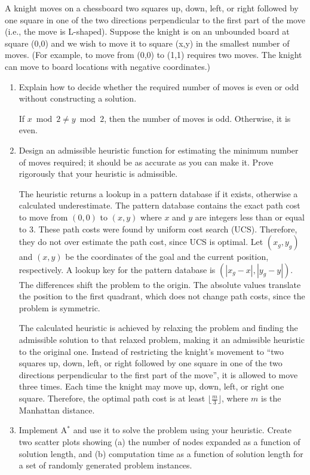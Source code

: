 \documentclass[12pt]{article}
\newenvironment{problem}[2][Problem]{\begin{trivlist}
\item[\hskip \labelsep {\bfseries #1}\hskip \labelsep {\bfseries #2.}]}{\end{trivlist}}
\begin{document}
\begin{problem}{5}
	A knight moves on a chessboard two squares up, down, left, or right followed by one square in one of the two directions perpendicular to the first part of the move (i.e., the move is L-shaped).
	Suppose the knight is on an unbounded board at square (0,0) and we wish to move it to square (x,y) in the smallest number of moves.
	(For example, to move from (0,0) to (1,1) requires two moves. The knight can move to board locations with negative coordinates.) 
	\begin{enumerate}
		\item Explain how to decide whether the required number of moves is even or odd without constructing a solution.

			\vspace{0.25cm}
			If $x \bmod 2 \neq y \bmod 2$, then the number of moves is odd. Otherwise, it is even.
		\item Design an admissible heuristic function for estimating the minimum number of moves required; it should be as accurate as you can make it.
			Prove rigorously that your heuristic is admissible.

			\vspace{0.25cm}
			The heuristic returns a lookup in a pattern database if it exists, otherwise a calculated underestimate.
			The pattern database contains the exact path cost to move from $(0,0)$ to $(x,y)$ where $x$ and $y$ are integers less than or equal to 3.
			These path costs were found by uniform cost search (UCS).
			Therefore, they do not over estimate the path cost, since UCS is optimal.
			Let $(x_g,y_g)$ and $(x, y)$ be the coordinates of the goal and the current position, respectively.
			A lookup key for the pattern database is $(|x_g-x|,|y_g-y|)$.
			The differences shift the problem to the origin.
			The absolute values translate the position to the first quadrant, which does not change path costs, since the problem is symmetric.

			The calculated heuristic is achieved by relaxing the problem and finding the admissible solution to that relaxed problem, making it an admissible heuristic to the original one.
			Instead of restricting the knight's movement to ``two squares up, down, left, or right followed by one square in one of the two directions perpendicular to the first part of the move'',
			it is allowed to move three times.
			Each time the knight may move up, down, left, or right one square.
			Therefore, the optimal path cost is at least $\lfloor\frac{m}{3}\rfloor$, where $m$ is the Manhattan distance.
		\item Implement A$^*$ and use it to solve the problem using your heuristic.
			Create two scatter plots showing (a) the number of nodes expanded as a function of solution length, and (b) computation time as a function of solution length for a set of randomly generated problem instances. 


\end{enumerate}
\end{problem}
\end{document}

